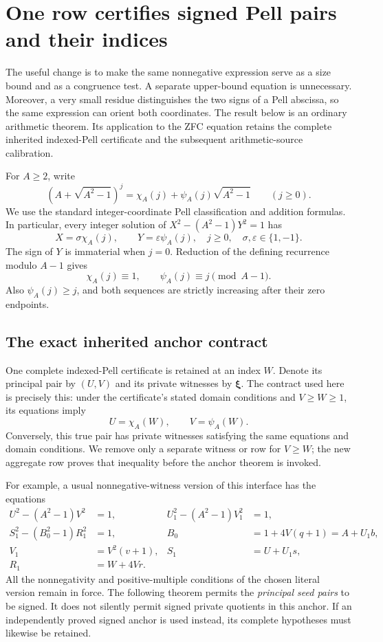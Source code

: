 \section{One row certifies signed Pell pairs and their indices}
\label{sec:one-row-pell}

The useful change is to make the same nonnegative expression serve as a
size bound and as a congruence test.  A separate upper-bound equation is
unnecessary.  Moreover, a very small residue distinguishes the two signs
of a Pell abscissa, so the same expression can orient both coordinates.
The result below is an ordinary arithmetic theorem.  Its application to
the ZFC equation retains the complete inherited indexed-Pell certificate
and the subsequent arithmetic-source calibration.

For $A\ge2$, write
\[
 (A+\sqrt{A^2-1})^j
   =\chi_A(j)+\psi_A(j)\sqrt{A^2-1}\qquad(j\ge0).
\]
We use the standard integer-coordinate Pell classification and addition
formulas.  In particular, every integer solution of
$X^2-(A^2-1)Y^2=1$ has
\[
 X=\sigma\chi_A(j),\qquad Y=\varepsilon\psi_A(j),
 \quad j\ge0,\quad \sigma,\varepsilon\in\{1,-1\}.
\]
The sign of $Y$ is immaterial when $j=0$.  Reduction of the defining
recurrence modulo $A-1$ gives
\begin{equation}\label{eq:one-row-residues}
 \chi_A(j)\equiv1,\qquad \psi_A(j)\equiv j\pmod{A-1}.
\end{equation}
Also $\psi_A(j)\ge j$, and both sequences are strictly increasing after
their zero endpoints.

\subsection{The exact inherited anchor contract}

One complete indexed-Pell certificate is retained at an index $W$.
Denote its principal pair by $(U,V)$ and its private witnesses by
$\boldsymbol\xi$.  The contract used here is precisely this: under the
certificate's stated domain conditions and $V\ge W\ge1$, its equations
imply
\[
 U=\chi_A(W),\qquad V=\psi_A(W).
\]
Conversely, this true pair has private witnesses satisfying the same
equations and domain conditions.  We remove only a separate witness or
row for $V\ge W$; the new aggregate row proves that inequality before
the anchor theorem is invoked.

For example, a usual nonnegative-witness version of this interface has
the equations
\begin{align*}
 U^2-(A^2-1)V^2&=1,&
 U_1^2-(A^2-1)V_1^2&=1,\\
 S_1^2-(B_0^2-1)R_1^2&=1,&
 B_0&=1+4V(q+1)=A+U_1b,\\
 V_1&=V^2(v+1),&
 S_1&=U+U_1s,\\
 R_1&=W+4Vr.
\end{align*}
All the nonnegativity and positive-multiple conditions of the chosen
literal version remain in force.  The following theorem permits the
\emph{principal seed pairs} to be signed.  It does not silently permit
signed private quotients in this anchor.  If an independently proved
signed anchor is used instead, its complete hypotheses must likewise
be retained.


